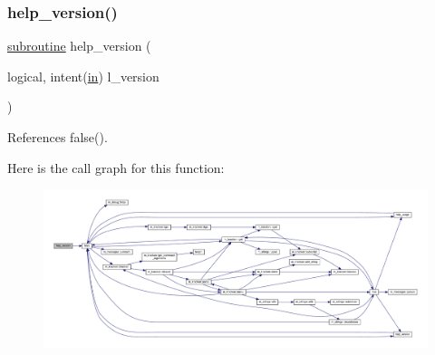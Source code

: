 \subsubsection{\texorpdfstring{help\+\_\+version()}{help\_version()}}
{\footnotesize\ttfamily \hyperlink{M__stopwatch_83_8txt_acfbcff50169d691ff02d4a123ed70482}{subroutine} help\+\_\+version (\begin{DoxyParamCaption}\item[{logical, intent(\hyperlink{M__journal_83_8txt_afce72651d1eed785a2132bee863b2f38}{in})}]{l\+\_\+version }\end{DoxyParamCaption})}



References false().

Here is the call graph for this function\+:
\nopagebreak
\begin{figure}[H]
\begin{center}
\leavevmode
\includegraphics[width=350pt]{__showumask_8f90_a39c21619b08a3c22f19e2306efd7f766_cgraph}
\end{center}
\end{figure}
